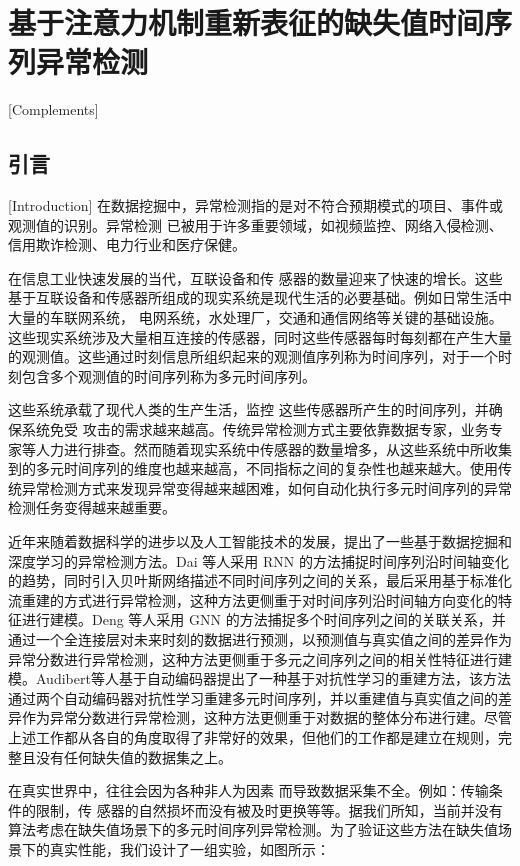 \chapter{基于注意力机制重新表征的缺失值时间序列异常检测}[Complements]

\section{引言}[Introduction]
在数据挖掘中，异常检测指的是对不符合预期模式的项目、事件或观测值的识别。异常检测 已被用于许多重要领域，如视频监控、网络入侵检测、信用欺诈检测、电力行业和医疗保健。

在信息工业快速发展的当代，互联设备和传 感器的数量迎来了快速的增长。这些基于互联设备和传感器所组成的现实系统是现代生活的必要基础。例如日常生活中大量的车联网系统， 电网系统，水处理厂，交通和通信网络等关键的基础设施。这些现实系统涉及大量相互连接的传感器，同时这些传感器每时每刻都在产生大量的观测值。这些通过时刻信息所组织起来的观测值序列称为时间序列，对于一个时刻包含多个观测值的时间序列称为多元时间序列。

这些系统承载了现代人类的生产生活，监控 这些传感器所产生的时间序列，并确保系统免受 攻击的需求越来越高。传统异常检测方式主要依靠数据专家，业务专家等人力进行排查。然而随着现实系统中传感器的数量增多，从这些系统中所收集到的多元时间序列的维度也越来越高，不同指标之间的复杂性也越来越大。使用传统异常检测方式来发现异常变得越来越困难，如何自动化执行多元时间序列的异常检测任务变得越来越重要。

近年来随着数据科学的进步以及人工智能技术的发展，提出了一些基于数据挖掘和深度学习的异常检测方法。Dai 等人采用 RNN 的方法捕捉时间序列沿时间轴变化的趋势，同时引入贝叶斯网络描述不同时间序列之间的关系，最后采用基于标准化流重建的方式进行异常检测，这种方法更侧重于对时间序列沿时间轴方向变化的特征进行建模。Deng 等人采用 GNN 的方法捕捉多个时间序列之间的关联关系，并通过一个全连接层对未来时刻的数据进行预测，以预测值与真实值之间的差异作为异常分数进行异常检测，这种方法更侧重于多元之间序列之间的相关性特征进行建模。Audibert等人基于自动编码器提出了一种基于对抗性学习的重建方法，该方法通过两个自动编码器对抗性学习重建多元时间序列，并以重建值与真实值之间的差异作为异常分数进行异常检测，这种方法更侧重于对数据的整体分布进行建。尽管上述工作都从各自的角度取得了非常好的效果，但他们的工作都是建立在规则，完整且没有任何缺失值的数据集之上。

在真实世界中，往往会因为各种非人为因素 而导致数据采集不全。例如：传输条件的限制，传 感器的自然损坏而没有被及时更换等等。据我们所知，当前并没有算法考虑在缺失值场景下的多元时间序列异常检测。为了验证这些方法在缺失值场景下的真实性能，我们设计了一组实验，如图所示：

